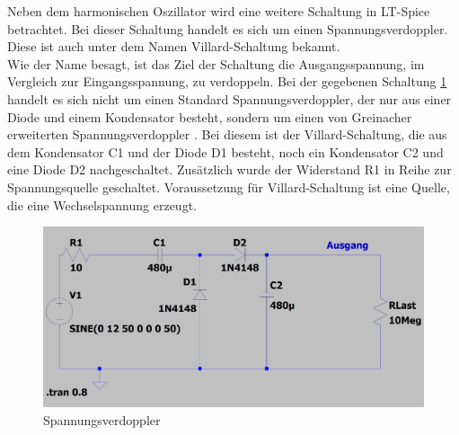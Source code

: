 Neben dem harmonischen Oszillator wird eine weitere Schaltung in LT-Spice betrachtet. Bei dieser Schaltung handelt es sich um einen Spannungsverdoppler. Diese ist auch unter dem Namen Villard-Schaltung bekannt.\\

Wie der Name besagt, ist das Ziel der Schaltung die Ausgangsspannung, im Vergleich zur Eingangsspannung, zu verdoppeln. Bei der gegebenen Schaltung \ref{bspS} handelt es sich nicht um einen Standard Spannungsverdoppler, der nur aus einer Diode und einem Kondensator besteht, sondern um einen von Greinacher erweiterten Spannungsverdoppler . Bei diesem ist der Villard-Schaltung, die aus dem Kondensator C1 und der Diode D1 besteht, noch ein Kondensator C2 und eine Diode D2 nachgeschaltet. Zusätzlich wurde der Widerstand R1 in Reihe zur Spannungsquelle geschaltet. Voraussetzung für Villard-Schaltung ist eine Quelle, die eine Wechselspannung erzeugt. \\

\begin{figure}[h!]
	\includegraphics[width=\textwidth]{data/bspschaltung}
	\caption{Spannungsverdoppler}
	\label{bspS}
\end{figure}

\newpage

